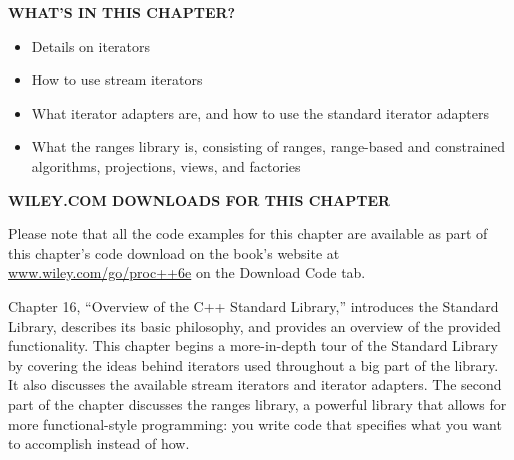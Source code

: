\noindent
\textbf{WHAT’S IN THIS CHAPTER?}

\begin{itemize}
\item
Details on iterators

\item
How to use stream iterators

\item
What iterator adapters are, and how to use the standard iterator adapters

\item
What the ranges library is, consisting of ranges, range-based and constrained algorithms, projections, views, and factories
\end{itemize}

\noindent
\textbf{WILEY.COM DOWNLOADS FOR THIS CHAPTER}

Please note that all the code examples for this chapter are available as part of this chapter’s code download on the book’s website at \url{www.wiley.com/go/proc++6e} on the Download Code tab.

Chapter 16, “Overview of the C++ Standard Library,” introduces the Standard Library, describes its basic philosophy, and provides an overview of the provided functionality. This chapter begins a more-in-depth tour of the Standard Library by covering the ideas behind iterators used throughout a big part of the library. It also discusses the available stream iterators and iterator adapters. The second part of the chapter discusses the ranges library, a powerful library that allows for more functional-style programming: you write code that specifies what you want to accomplish instead of how.